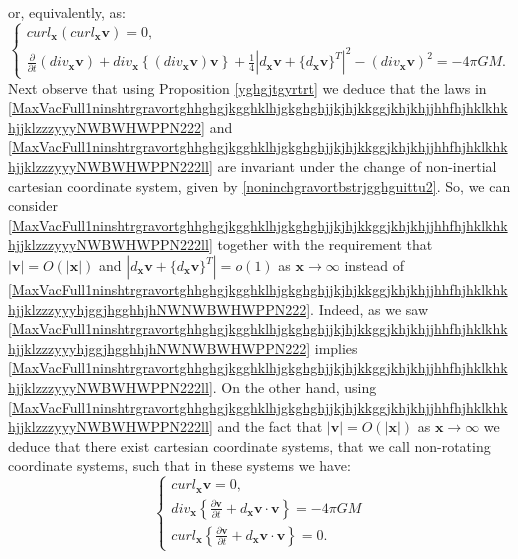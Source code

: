 \documentclass{article}
\theoremstyle{definition}
\theoremstyle{remark}
\renewcommand{\vec}[1]{\mathbf{#1}}
\newcommand{\er}{\eqref}
\newcommand{\er}{\eqref}
\begin{document}
or, equivalently, as:
\begin{equation}
\label{MaxVacFull1ninshtrgravortghhghgjkgghklhjgkghghjjkjhjkkggjkhjkhjjhhfhjhklkhkhjjklzzzyyyNWBWHWPPN222ll}
\begin{cases}
curl_{\vec x}\left(curl_{\vec x}\vec v\right)= 0,\\
\frac{\partial}{\partial t}\left(div_{\vec x}\vec v\right)+div_{\vec
x}\left\{\left(div_{\vec x}\vec v\right)\vec
v\right\}+\frac{1}{4}\left|d_{\vec x}\vec v+\{d_{\vec x}\vec
v\}^T\right|^2-\left(div_{\vec x}\vec v\right)^2= -4\pi GM.
\end{cases}
\end{equation}
Next observe that using Proposition \ref{yghgjtgyrtrt}
we deduce that the laws in
\er{MaxVacFull1ninshtrgravortghhghgjkgghklhjgkghghjjkjhjkkggjkhjkhjjhhfhjhklkhkhjjklzzzyyyNWBWHWPPN222}
and
\er{MaxVacFull1ninshtrgravortghhghgjkgghklhjgkghghjjkjhjkkggjkhjkhjjhhfhjhklkhkhjjklzzzyyyNWBWHWPPN222ll}
are invariant under the change of non-inertial cartesian coordinate
system, given by \er{noninchgravortbstrjgghguittu2}. So, we can
consider
\er{MaxVacFull1ninshtrgravortghhghgjkgghklhjgkghghjjkjhjkkggjkhjkhjjhhfhjhklkhkhjjklzzzyyyNWBWHWPPN222ll}
together with the requirement that $|\vec v|=O(|\vec x|)$ and
$\left|d_{\vec x}\vec v+\{d_{\vec x}\vec v\}^T\right|=o(1)$ as $\vec
x\to\infty$ instead of
\er{MaxVacFull1ninshtrgravortghhghgjkgghklhjgkghghjjkjhjkkggjkhjkhjjhhfhjhklkhkhjjklzzzyyyhjggjhgghhjhNWNWBWHWPPN222}.
Indeed, as we saw
\er{MaxVacFull1ninshtrgravortghhghgjkgghklhjgkghghjjkjhjkkggjkhjkhjjhhfhjhklkhkhjjklzzzyyyhjggjhgghhjhNWNWBWHWPPN222}
implies
\er{MaxVacFull1ninshtrgravortghhghgjkgghklhjgkghghjjkjhjkkggjkhjkhjjhhfhjhklkhkhjjklzzzyyyNWBWHWPPN222ll}.
On the other hand, using
\er{MaxVacFull1ninshtrgravortghhghgjkgghklhjgkghghjjkjhjkkggjkhjkhjjhhfhjhklkhkhjjklzzzyyyNWBWHWPPN222ll}
and the fact that $|\vec v|=O(|\vec x|)$ as $\vec x\to\infty$ we
deduce that there exist cartesian coordinate systems, that we call
non-rotating coordinate systems, such that in these systems we have:
\begin{equation}
\label{MaxVacFull1ninshtrgravortghhghgjkgghklhjgkghghjjkjhjkkggjkhjkhjjhhfhjhklkhkhjjklzzzyyyhjggjhgghhjhNWBWHWPPN222}
\begin{cases}
curl_{\vec x}\vec v= 0,\\
div_{\vec x}\left\{\frac{\partial\vec v}{\partial t}+d_\vec x\vec
v\cdot\vec v\right\}= -4\pi GM\\
curl_{\vec x}\left\{\frac{\partial\vec v}{\partial t}+d_\vec x\vec
v\cdot\vec v\right\}=0.
\end{cases}
\end{equation}
\end{document}
